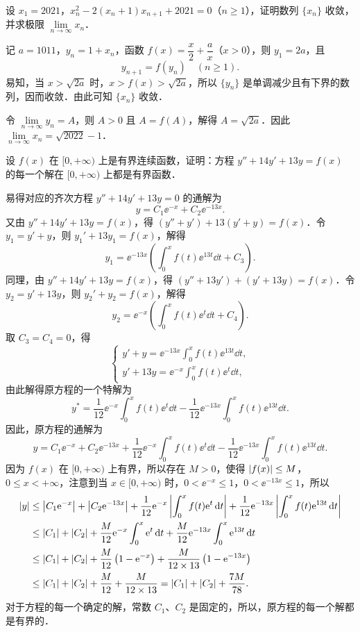 设 $x_{1}=2021$，$x_{n}^{2}-2(x_{n}+1)x_{n+1}+2021=0$（$n\ge1$），证明数列 $\{x_{n}\}$ 收敛，并求极限 $\lim\limits_{n\to\infty}x_{n}$．
\begin{solution}
记 $a=1011$，$y_{n}=1+x_{n}$，函数 $f(x)=\dfrac{x}{2}+\dfrac{a}{x}$（$x>0$），则 $y_{1}=2a$，且
\[
y_{n+1}=f(y_{n})\quad(n\ge1).
\]
易知，当 $x>\sqrt{2a}$ 时，$x>f(x)>\sqrt{2a}$，所以 $\{y_{n}\}$ 是单调减少且有下界的数列，因而收敛．由此可知 $\{x_{n}\}$ 收敛．

令 $\lim\limits_{n\to\infty}y_{n}=A$，则 $A>0$ 且 $A=f(A)$，解得 $A=\sqrt{2a}$．因此 $\lim\limits_{n\to\infty}x_{n}=\sqrt{2022}-1$．
\end{solution}

设 $f(x)$ 在 $[0,+\infty)$ 上是有界连续函数，证明：方程 $y''+14y'+13y=f(x)$ 的每一个解在 $[0,+\infty)$ 上都是有界函数．
\begin{solution}
易得对应的齐次方程 $y''+14y'+13y=0$ 的通解为
\[
y=C_{1}\ee^{-x}+C_{2}\ee^{-13x}.
\]
又由 $y''+14y'+13y=f(x)$，得 $(y''+y')+13(y'+y)=f(x)$．令 $y_{1}=y'+y$，则 $y_{1}'+13y_{1}=f(x)$，解得
\[
y_{1}=\ee^{-13x}\left(\int_{0}^{x}f(t)\ee^{13t}\dd t+C_{3}\right).
\]
同理，由 $y''+14y'+13y=f(x)$，得 $(y''+13y')+(y'+13y)=f(x)$．令 $y_{2}=y'+13y$，则 $y_{2}'+y_{2}=f(x)$，解得
\[
y_{2}=\ee^{-x}\left(\int_{0}^{x}f(t)\ee^{t}\dd t+C_{4}\right).
\]
取 $C_{3}=C_{4}=0$，得
\[
\begin{cases}
y'+y=\ee^{-13x}\int_{0}^{x}f(t)\ee^{13t}\dd t,\\[2ex]
y'+13y=\ee^{-x}\int_{0}^{x}f(t)\ee^{t}\dd t,
\end{cases}
\]
由此解得原方程的一个特解为
\[
y^{*}=\frac{1}{12}\ee^{-x}\int_{0}^{x}f(t)\ee^{t}\dd t-\frac{1}{12}\ee^{-13x}\int_{0}^{x}f(t)\ee^{13t}\dd t.
\]
因此，原方程的通解为
\[
y=C_{1}\ee^{-x}+C_{2}\ee^{-13x}+\frac{1}{12}\ee^{-x}\int_{0}^{x}f(t)\ee^{t}\dd t-\frac{1}{12}\ee^{-13x}\int_{0}^{x}f(t)\ee^{13t}\dd t.
\]
因为 $f(x)$ 在 $[0,+\infty)$ 上有界，所以存在 $M>0$，使得 $\left|f(x)\right|\le M$，$0\le x<+\infty$，注意到当 $x\in[0,+\infty)$ 时，$0<\ee^{-x}\le1$，$0<\ee^{-13x}\le1$，所以
\begin{align*}
\left|y\right|&\le\left|C_{1}\mathrm{e}^{-x}\right|+\left|C_{2}\mathrm{e}^{-13x}\right|+\frac{1}{12}\mathrm{e}^{-x}\left|\int_{0}^{x}f(t)\mathrm{e}^{t}\,\mathrm{d} t\right|+\frac{1}{12}\mathrm{e}^{-13x}\left|\int_{0}^{x}f(t)\mathrm{e}^{13t}\,\mathrm{d} t\right|\\
&\le\left|C_{1}\right|+\left|C_{2}\right|+\frac{M}{12}\mathrm{e}^{-x}\int_{0}^{x}\mathrm{e}^{t}\,\mathrm{d} t+\frac{M}{12}\mathrm{e}^{-13x}\int_{0}^{x}\mathrm{e}^{13t}\,\mathrm{d} t\\
&\le\left|C_{1}\right|+\left|C_{2}\right|+\frac{M}{12}\left(1-\mathrm{e}^{-x}\right)+\frac{M}{12\times13}\left(1-\mathrm{e}^{-13x}\right)\\
&\le\left|C_{1}\right|+\left|C_{2}\right|+\frac{M}{12}+\frac{M}{12\times13}=\left|C_{1}\right|+\left|C_{2}\right|+\frac{7M}{78}.
\end{align*}
对于方程的每一个确定的解，常数 $C_{1}$、$C_{2}$ 是固定的，所以，原方程的每一个解都是有界的．
\end{solution}

